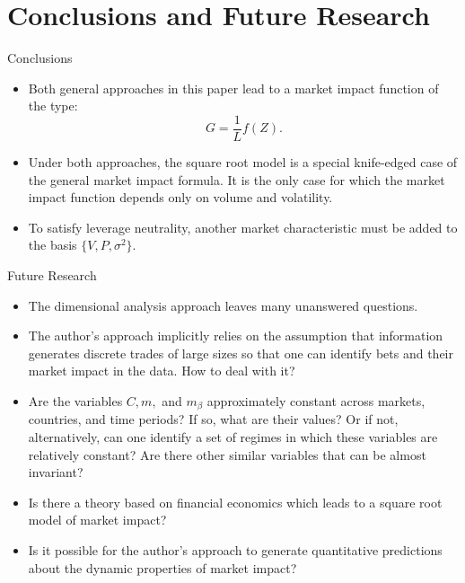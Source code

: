 \documentclass[aspectratio=169]{beamer}
\begin{document}
\section{Conclusions and Future Research}

\begin{frame}{Conclusions}
    \begin{itemize}
        \item Both general approaches in this paper lead to a market impact function of the type:
              \begin{equation*}
                  G = \frac{1}{L} f(Z).
              \end{equation*}
        \item Under both approaches, the square root model is a special knife-edged case of the general
              market impact formula. It is the only case for which the market impact function depends only on volume and volatility.
        \item To satisfy leverage
              neutrality, another market characteristic must be added to the basis $\{V, P, \sigma^2\}$.
    \end{itemize}
\end{frame}

\begin{frame}{Future Research}
    \begin{itemize}
        \item The dimensional analysis approach leaves many unanswered questions.
        \item The author's approach implicitly relies on the assumption that information generates discrete trades of large sizes so that one
              can identify bets and their market impact in the data. How to deal with it?
        \item  Are the variables $C, m,$ and $m_\beta$ approximately constant across markets, countries, and time periods? If
              so, what are their values? Or if not, alternatively, can one identify a set of regimes in which these
              variables are relatively constant? Are there other similar variables that can be almost invariant?
        \item Is there a theory based on financial economics which leads to a square root model
              of market impact?
        \item Is it possible for the author's approach to generate quantitative predictions about the dynamic properties of market impact?

    \end{itemize}
\end{frame}
\end{document}
